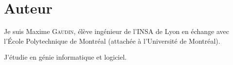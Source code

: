 \section{Auteur}
Je suis Maxime \textsc{Gaudin}, élève ingénieur de l'INSA de Lyon en
échange avec l'École Polytechnique de Montréal (attachée à l'Université de
Montréal).

J'étudie en génie informatique et logiciel.
